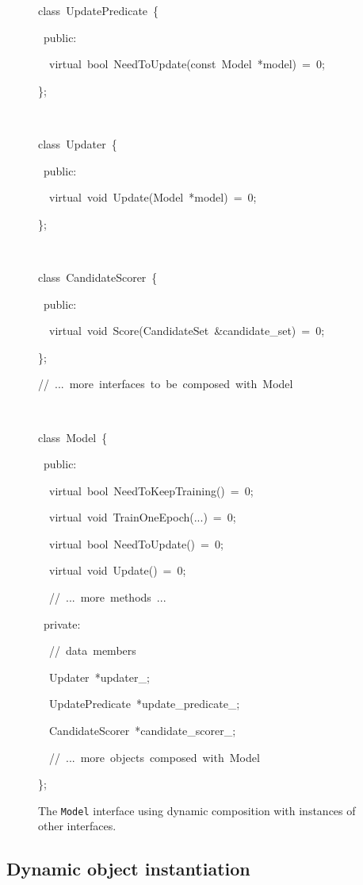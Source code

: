 \documentclass[a4paper]{article}
\newenvironment{lyxcode}
{\par\begin{list}{}{
\scriptsize
\setlength{\leftmargin}{0.1in}
\setlength{\rightmargin}{\leftmargin}
\setlength{\listparindent}{0pt}%
\raggedright
\setlength{\itemsep}{0pt}
\setlength{\parsep}{0pt}
\normalfont\ttfamily}%
 \item[]}
{\end{list}}
\begin{document}
\begin{figure}
\begin{lyxcode}
class~UpdatePredicate~\{

~public:

~~virtual~bool~NeedToUpdate(const~Model~{*}model)~=~0;

\};

\

class~Updater~\{

~public:

~~virtual~void~Update(Model~{*}model)~=~0;

\};

\

class~CandidateScorer~\{

~public:

~~virtual~void~Score(CandidateSet~\&candidate\_set)~=~0;

\};

//~...~more~interfaces~to~be~composed~with~Model

\

class~Model~\{

~public:

~~virtual~bool~NeedToKeepTraining()~=~0;

~~virtual~void~TrainOneEpoch(...)~=~0;

~~virtual~bool~NeedToUpdate()~=~0;

~~virtual~void~Update()~=~0;

~~//~...~more~methods~...

~private:

~~//~data~members

~~Updater~{*}updater\_;

~~UpdatePredicate~{*}update\_predicate\_;

~~CandidateScorer~{*}candidate\_scorer\_;

~~//~...~more~objects~composed~with~Model

\};
\end{lyxcode}
\caption{\label{fig:model-with-composition}The \texttt{Model} interface using
dynamic composition with instances of other interfaces.}
\end{figure}



\subsection{Dynamic object instantiation}
\end{document}
